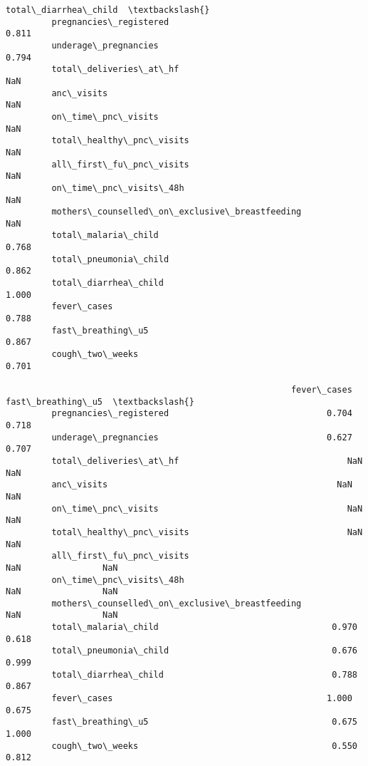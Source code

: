 \documentclass[11pt]{article}
\begin{document}
\begin{Verbatim}[commandchars=\\\{\}]
                                                        total\_diarrhea\_child  \textbackslash{}
         pregnancies\_registered                                        0.811   
         underage\_pregnancies                                          0.794   
         total\_deliveries\_at\_hf                                          NaN   
         anc\_visits                                                      NaN   
         on\_time\_pnc\_visits                                              NaN   
         total\_healthy\_pnc\_visits                                        NaN   
         all\_first\_fu\_pnc\_visits                                         NaN   
         on\_time\_pnc\_visits\_48h                                          NaN   
         mothers\_counselled\_on\_exclusive\_breastfeeding                   NaN   
         total\_malaria\_child                                           0.768   
         total\_pneumonia\_child                                         0.862   
         total\_diarrhea\_child                                          1.000   
         fever\_cases                                                   0.788   
         fast\_breathing\_u5                                             0.867   
         cough\_two\_weeks                                               0.701   
         
                                                        fever\_cases  fast\_breathing\_u5  \textbackslash{}
         pregnancies\_registered                               0.704              0.718   
         underage\_pregnancies                                 0.627              0.707   
         total\_deliveries\_at\_hf                                 NaN                NaN   
         anc\_visits                                             NaN                NaN   
         on\_time\_pnc\_visits                                     NaN                NaN   
         total\_healthy\_pnc\_visits                               NaN                NaN   
         all\_first\_fu\_pnc\_visits                                NaN                NaN   
         on\_time\_pnc\_visits\_48h                                 NaN                NaN   
         mothers\_counselled\_on\_exclusive\_breastfeeding          NaN                NaN   
         total\_malaria\_child                                  0.970              0.618   
         total\_pneumonia\_child                                0.676              0.999   
         total\_diarrhea\_child                                 0.788              0.867   
         fever\_cases                                          1.000              0.675   
         fast\_breathing\_u5                                    0.675              1.000   
         cough\_two\_weeks                                      0.550              0.812   
         

\end{Verbatim}
\end{document}
